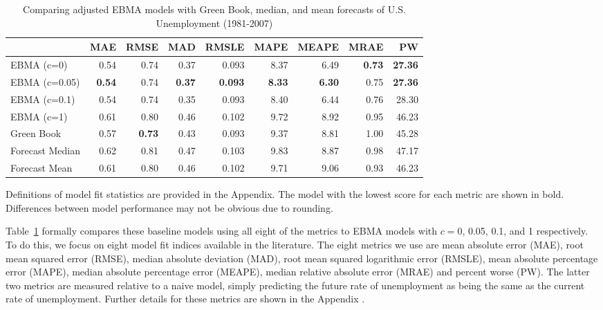 \documentclass[12pt,fullpage,endnotes]{article}
\begin{document}
\begin{table}[h]
\caption{Comparing adjusted EBMA models with Green Book, median, and mean forecasts of U.S. Unemployment (1981-2007)}
\begin{center}
\begin{tabular}{lrrrrrrrr}
\toprule
 & MAE & RMSE & MAD & RMSLE & MAPE & MEAPE & MRAE & PW \\ 
\midrule
 EBMA (c=0)& 0.54 & 0.74 & 0.37 & 0.093 & 8.37 & 6.49 & \textbf{0.73} & \textbf{27.36} \\ 
  EBMA (c=0.05)& \textbf{0.54} & 0.74 &\textbf{ 0.37} & \textbf{0.093} & \textbf{8.33} & \textbf{6.30} & 0.75 & \textbf{27.36} \\ 
 EBMA (c=0.1)& 0.54 & 0.74 & 0.35 & 0.093 & 8.40 & 6.44 & 0.76 & 28.30 \\ 
EBMA (c=1) & 0.61 & 0.80 & 0.46 & 0.102 & 9.72 & 8.92 & 0.95 & 46.23 \\ 
 Green Book& 0.57 & \textbf{0.73} & 0.43 & 0.093 & 9.37 & 8.81 & 1.00 & 45.28 \\ 
 Forecast Median& 0.62 & 0.81 & 0.47 & 0.103 & 9.83 & 8.87 & 0.98 & 47.17 \\ 
Forecast Mean& 0.61 & 0.80 & 0.46 & 0.102 & 9.71 & 9.06 & 0.93 & 46.23 \\ 
\bottomrule
\end{tabular}
\end{center}


\label{compareTable1}
Definitions of model fit statistics are provided in the Appendix. The model with the lowest score for each metric are shown in bold.  Differences between model performance may not be obvious due to rounding.
\end{table}


Table~\ref{compareTable1} formally compares these baseline models
using all eight of the metrics to EBMA models with $c=$0, 0.05, 0.1,
and 1 respectively.  To do this, we focus on eight model fit indices
available in the literature.  The eight metrics we use are mean
absolute error (MAE), root mean squared error (RMSE), median absolute
deviation (MAD), root mean squared logarithmic error (RMSLE), mean
absolute percentage error (MAPE), median absolute percentage error
(MEAPE), median relative absolute error (MRAE) and percent worse (PW).
The latter two metrics are measured relative to a naive model, simply
predicting the future rate of unemployment as being the same as the
current rate of unemployment.  Further details for these metrics are
shown in the Appendix \citep{brandt:freeman:schrodt:2011}.
\end{document}
